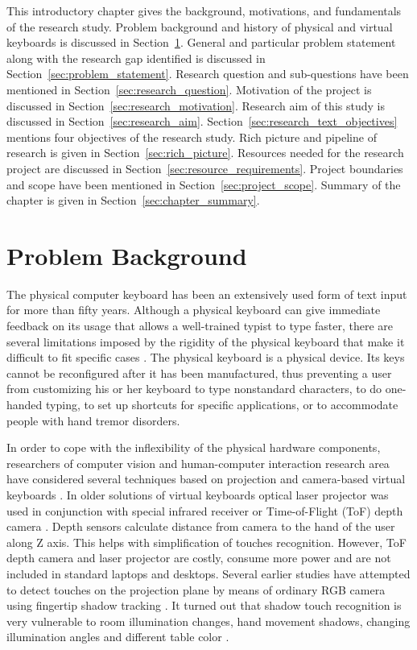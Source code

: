 This introductory chapter gives the background, motivations, and fundamentals of the research study. Problem background and history of physical and virtual keyboards is discussed in Section~\ref{sec:problem_background}. General and particular problem statement along with the research gap identified is discussed in Section~\ref{sec:problem_statement}. Research question and sub-questions have been mentioned in Section~\ref{sec:research_question}. Motivation of the project is discussed in Section~\ref{sec:research_motivation}. Research aim of this study is discussed in Section~\ref{sec:research_aim}. Section~\ref{sec:research_text_objectives} mentions four objectives of the research study. Rich picture and pipeline of research is given in Section~\ref{sec:rich_picture}. Resources needed for the research project are discussed in Section~\ref{sec:resource_requirements}. Project boundaries and scope have been mentioned in Section~\ref{sec:project_scope}. Summary of the chapter is given in Section~\ref{sec:chapter_summary}.

\section{Problem Background}
\label{sec:problem_background}
The physical computer keyboard has been an extensively used form of text input for more than fifty years. Although a physical keyboard can give immediate feedback on its usage that allows a well-trained typist to type faster, there are several limitations imposed by the rigidity of the physical keyboard that make it difficult to fit specific cases \cite{ReviewVirtualKeyboard2020}. The physical keyboard is a physical device. Its keys cannot be reconfigured after it has been manufactured, thus preventing a user from customizing his or her keyboard to type nonstandard characters, to do one-handed typing, to set up shortcuts for specific applications, or to accommodate people with hand tremor disorders.

In order to cope with the inflexibility of the physical hardware components, researchers of computer vision and human-computer interaction research area have considered several techniques based on projection and camera-based virtual keyboards \cite{Zhang2001Visual, Srivastava2012RealTime, Khare2019QWERTY, Ji2018Local}. In older solutions of virtual keyboards optical laser projector was used in conjunction with special infrared receiver or Time-of-Flight (ToF) depth camera \cite{Lee2019Virtual, Kudale2016RealTime}. Depth sensors calculate distance from camera to the hand of the user along Z axis. This helps with simplification of touches recognition. However, ToF depth camera and laser projector are costly, consume more power and are not included in standard laptops and desktops. Several earlier studies have attempted to detect touches on the projection plane by means of ordinary RGB camera using fingertip shadow tracking \cite{Thomas2013Camera, Posner2012Single}. It turned out that shadow touch recognition is very vulnerable to room illumination changes, hand movement shadows, changing illumination angles and different table color \cite{Yue2014Blind}.

